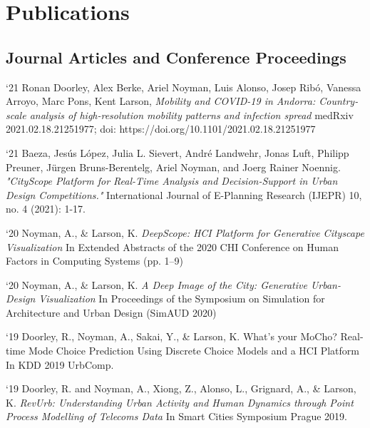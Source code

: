 \section*{Publications}

\subsection*{Journal Articles and Conference Proceedings}

\begin{tablist}

    \item[`21] \tab
    Ronan Doorley, Alex Berke, Ariel Noyman, Luis Alonso, Josep Ribó, Vanessa Arroyo, Marc Pons, Kent Larson,
    \textit{Mobility and COVID-19 in Andorra: Country-scale analysis of high-resolution mobility patterns and infection spread}
    medRxiv 2021.02.18.21251977; doi: https://doi.org/10.1101/2021.02.18.21251977


    \item[`21] \tab
    Baeza, Jesús López, Julia L. Sievert, André Landwehr, Jonas Luft, Philipp Preuner, Jürgen Bruns-Berentelg, Ariel Noyman, and Joerg Rainer Noennig. \textit{"CityScope Platform for Real-Time Analysis and Decision-Support in Urban Design Competitions."} International Journal of E-Planning Research (IJEPR) 10, no. 4 (2021): 1-17.


    \item[`20] \tab  Noyman, A., \& Larson, K.
    \textit{DeepScope: HCI Platform for Generative Cityscape Visualization
    }
    In Extended Abstracts of the 2020 CHI Conference on Human Factors in Computing Systems (pp. 1–9)

    \item[`20] \tab  Noyman, A., \& Larson, K.
    \textit{A Deep Image of the City: Generative Urban-Design Visualization
    }
    In Proceedings of the Symposium on Simulation for Architecture and Urban Design (SimAUD 2020)


    \item[`19] \tab  Doorley, R., Noyman, A., Sakai, Y., \& Larson, K.
    What’s your MoCho? Real-time Mode Choice Prediction Using Discrete Choice Models and a HCI Platform
    In KDD 2019 UrbComp.

    \item[`19] \tab  Doorley, R. and Noyman, A., Xiong, Z., Alonso, L., Grignard, A., \& Larson, K.
    \textit{RevUrb: Understanding Urban Activity and Human Dynamics through Point Process Modelling of Telecoms Data}
    In Smart Cities Symposium Prague 2019.


\end{tablist}

